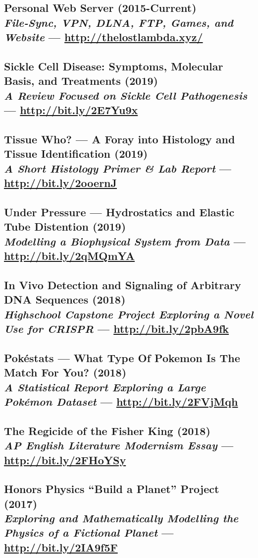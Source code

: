 \documentclass[twocolumn, a4paper, fontsize=9pt, headsepline, footsepline]{scrartcl}
\begin{document}
\subsection*{Personal Web Server (2015-Current)\\\textmd{\emph{File-Sync, VPN,
    DLNA, FTP, Games, and Website} — \url{http://thelostlambda.xyz/}}}
\subsection*{Sickle Cell Disease: Symptoms, Molecular Basis, and Treatments
(2019)\\\textmd{\emph{A Review Focused on Sickle Cell Pathogenesis} — \url{http://bit.ly/2E7Yu9x}}}
\subsection*{Tissue Who? — A Foray into Histology and Tissue Identification
  (2019)\\\textmd{\emph{A Short Histology Primer \& Lab Report} —
    \url{http://bit.ly/2ooernJ}}}
\subsection*{Under Pressure — Hydrostatics and Elastic Tube Distention
  (2019)\\\textmd{\emph{Modelling a Biophysical System from Data} — \url{http://bit.ly/2qMQmYA}}}
\subsection*{In Vivo Detection and Signaling of Arbitrary DNA Sequences
  (2018)\\\textmd{\emph{Highschool Capstone Project Exploring a Novel Use for
    CRISPR} — \url{http://bit.ly/2pbA9fk}}}
\subsection*{Pokéstats — What Type Of Pokemon Is The Match For You?
  (2018)\\\textmd{\emph{A Statistical Report Exploring a Large Pokémon Dataset} — \url{http://bit.ly/2FVjMqh}}}
\subsection*{The Regicide of the Fisher King (2018)\\\textmd{\emph{AP English
    Literature Modernism Essay} — \url{http://bit.ly/2FHoYSy}}}
\subsection*{Honors Physics “Build a Planet” Project (2017)\\\textmd{\emph{Exploring and
    Mathematically Modelling the Physics of a Fictional Planet} — \url{http://bit.ly/2IA9f5F}}}
\end{document}
